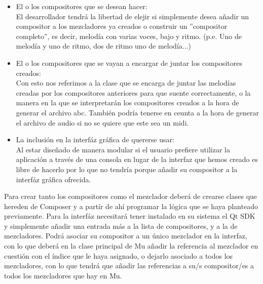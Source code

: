 \begin{itemize}

\item El o los compositores que se desean hacer:
\\El desarrollador tendrá la libertad de elejir si simplemente desea añadir un compositor a los mezcladores ya creados o construir un ''compositor completo'', es decir, melodía con varias voces, bajo y ritmo. (p.e. Uno de melodía y uno de ritmo, dos de ritmo uno de melodía...)

\item El o los compositores que se vayan a encargar de juntar los compositores creados:
\\Con esto nos referimos a la clase que se encarga de juntar las melodías creadas por los compositores anteriores para que suente correctamente, o la manera en la que se interpretarán los compositores creados a la hora de generar el archivo abc. También podría tenerse en ceunta a la hora de generar el archivo de audio si no se quiere que este sea un midi.

\item La inclusión en la interfáz gráfica de quererse usar:
\\Al estar diseñado de manera modular si el usuario prefiere utilizar la aplicación a través de una consola en lugar 	de la interfaz que hemos creado es libre de hacerlo por lo que no tendría porque añadir su compositor a la interfáz gráfica ofrecida.

\end{itemize} 

Para crear tanto los compositores como el mezclador deberá de crearse clases que hereden de Composer y a partír de ahí programar la lógica que se haya planteado previamente.
Para la interfáz necesitará tener instalado en su sistema el Qt SDK y simplemente añadir una entrada más a la lista de compositores, y a la de mezcladores. Podrá asociar su compositor a un único mezclador en la interfaz, con lo que deberá en la clase principal de Mu añadir la referencia al mezclador en cuestión con el índice que le haya asignado, o dejarlo asociado a todos los mezcladores, con lo que tendrá que añadir las referencias a su/s compositor/es a todos los mezcladores que hay en Mu.